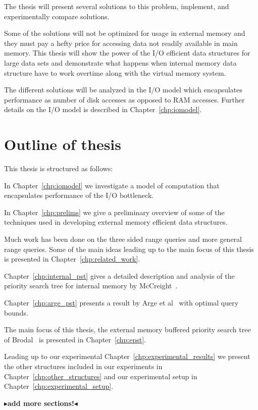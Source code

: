\documentclass[twoside,11pt,openright]{report}
\newcommand{\todo}[1]{{\color[rgb]{.5,0,0}\textbf{$\blacktriangleright$#1$\blacktriangleleft$}}}
\begin{document}
The thesis will present several solutions to this problem, implement, and experimentally compare solutions.

Some of the solutions will not be optimized for usage in external memory and they must pay a hefty price for accessing data not readily available in main memory. This thesis will show the power of the I/O efficient data structures for large data sets and demonstrate what happens when internal memory data structure have to work overtime along with the virtual memory system.

The different solutions will be analyzed in the I/O model which encapsulates performance as number of disk accesses as opposed to RAM accesses. Further details on the I/O model is described in Chapter~\ref{chp:iomodel}.

\section{Outline of thesis}
This thesis is structured as follows:

In Chapter~\ref{chp:iomodel} we investigate a model of computation that encapsulates performance of the I/O bottleneck.

In Chapter~\ref{chp:prelims} we give a preliminary overview of some of the techniques used in developing external memory efficient data structures.

Much work has been done on the three sided range queries and more general range queries. Some of the main ideas leading up to the main focus of this thesis is presented in Chapter~\ref{chp:related_work}.


Chapter~\ref{chp:internal_pst} gives a detailed description and analysis of the priority search tree for internal memory by McCreight~\cite{DBLP:journals/siamcomp/McCreight85}.

Chapter~\ref{chp:arge_pst} presents a result by Arge et al~\cite{arge_samoladas_vitter_1999} with optimal query bounds.

The main focus of this thesis, the external memory buffered priority search tree of Brodal~\cite{DBLP:journals/corr/Brodal15} is presented in Chapter~\ref{chp:epst}.

Leading up to our experimental Chapter~\ref{chp:experimental_results} we present the other structures included in our experiments in Chapter~\ref{chp:other_structures} and our experimental setup in Chapter~\ref{chp:experimental_setup}.

\todo{add more sections!}
\end{document}
